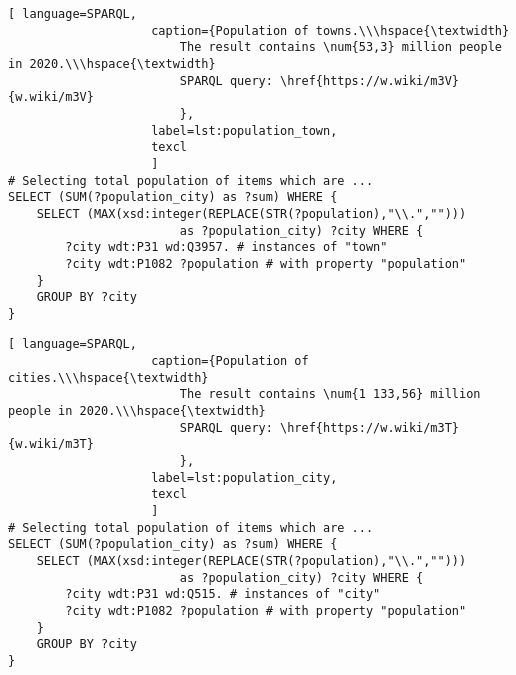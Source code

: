 \begin{lstlisting}[ language=SPARQL, 
                    caption={Population of towns.\\\hspace{\textwidth}
                        The result contains \num{53,3} million people in 2020.\\\hspace{\textwidth}
                        SPARQL query: \href{https://w.wiki/m3V}{w.wiki/m3V}
                        },
                    label=lst:population_town,
                    texcl 
                    ]
# Selecting total population of items which are ...
SELECT (SUM(?population_city) as ?sum) WHERE {                    
	SELECT (MAX(xsd:integer(REPLACE(STR(?population),"\\.",""))) 
						as ?population_city) ?city WHERE {
		?city wdt:P31 wd:Q3957.	# instances of "town"
		?city wdt:P1082 ?population # with property "population"                                  
	}
	GROUP BY ?city
}
\end{lstlisting}%


\newpage

\begin{lstlisting}[ language=SPARQL, 
                    caption={Population of cities.\\\hspace{\textwidth}
                        The result contains \num{1 133,56} million people in 2020.\\\hspace{\textwidth}
                        SPARQL query: \href{https://w.wiki/m3T}{w.wiki/m3T}
                        },
                    label=lst:population_city,
                    texcl 
                    ]
# Selecting total population of items which are ...
SELECT (SUM(?population_city) as ?sum) WHERE {                    
	SELECT (MAX(xsd:integer(REPLACE(STR(?population),"\\.",""))) 
						as ?population_city) ?city WHERE {
		?city wdt:P31 wd:Q515. # instances of "city"
		?city wdt:P1082 ?population # with property "population"
	}
	GROUP BY ?city
}
\end{lstlisting}%

